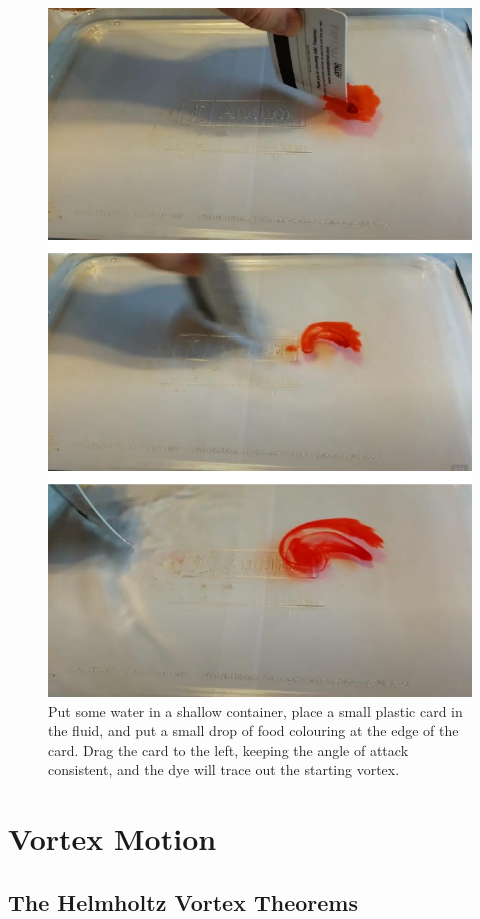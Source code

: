 \begin{figure}
\centering\includegraphics[width=0.8\linewidth]{Figures/Chapter4/fig_starting_vortex}
\caption{Put some water in a shallow container, place a small plastic card in the fluid, and put a small drop of food colouring at the edge of the card.  Drag the card to the left, keeping the angle of attack consistent, and the dye will trace out the starting vortex.}
\label{fig_starting_vortex}
\end{figure}

%
%

\section{Vortex Motion}


\subsection{The Helmholtz Vortex Theorems}

